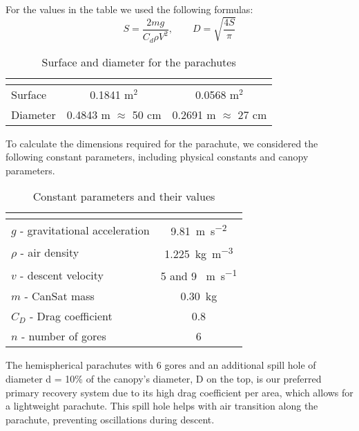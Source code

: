 For the values in the table we used the following formulas:
\begin{equation}\label{eq1}
S=\frac{2mg}{C_d \rho V^2}, \quad\quad D = \sqrt{\frac{4S}{\pi}}
\end{equation}

\begin{table}[htbp]
\centering
{}
\begin{tabular}{>{\centering\arraybackslash}lcc}
\rowcolor{CDOSRPrimary}
\hline
\textbf{\color{white!50}{Parameter}} & \multicolumn{1}{|c|}{\textbf{\color{white!50}{1st Parachute}}}  & \textbf{\color{white!50}{2nd Parachute}} \\
\hline
Surface & 0.1841 m$^{2}$ & 0.0568 m$^{2}$\\
Diameter & 0.4843 m $\approx$ 50 cm & 0.2691 m $\approx$ 27 cm \\
\hline
\end{tabular}
\caption{Surface and diameter for the parachutes}
\end{table}


To calculate the dimensions required for the parachute, we considered the following constant parameters, including physical constants and canopy parameters.

\begin{table}[htbp]
\centering
{}
\begin{tabular}{>{\centering\arraybackslash}lc}
\rowcolor{CDOSRPrimary}
\hline
\multicolumn{1}{|c|}{\textbf{\color{white!50}{Parameter}}}  & \textbf{\color{white!50}{Value}} \\
\hline
$g$ - gravitational acceleration & \SI{9.81 }{\meter\per\square\second} \\
\rowcolor{CDOSRSecondary!50}$\rho$ - air density & \SI{1.225}{\kilogram\per\cubic\metre} \\
$v$ - descent velocity & 5 and 9 \SI{}{\meter\per\second} \\
\rowcolor{CDOSRSecondary!50}$m$ - CanSat mass & \SI{0.30}{\kilogram} \\
$C_D$ - Drag coefficient & 0.8 \\
\rowcolor{CDOSRSecondary!50}$n$ - number of gores & 6 \\
\hline
\end{tabular}
\caption{Constant parameters and their values}
\end{table}


The hemispherical parachutes with 6 gores and an additional spill hole of diameter d = 10\% of the canopy’s diameter, D on the top, is our preferred primary recovery system due to its high drag coefficient per area, which allows for a lightweight parachute. This spill hole helps with air transition along the parachute, preventing oscillations during descent.


